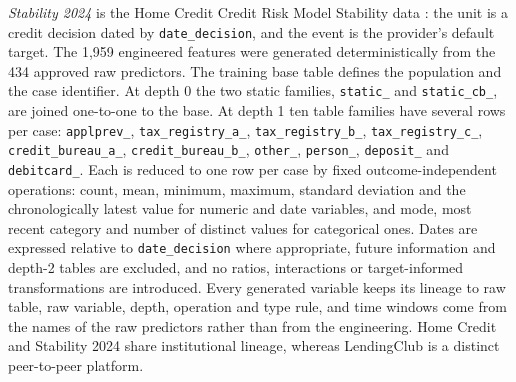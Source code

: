\documentclass[final,5p,twocolumn]{elsarticle}
\begin{document}
\emph{Stability 2024} is the Home Credit Credit Risk Model Stability data \cite{homecredit2024}: the unit is a credit decision dated by \texttt{date\_\allowbreak decision}, and the event is the provider's default target. The 1,959 engineered features were generated deterministically from the 434 approved raw predictors. The training base table defines the population and the case identifier. At depth 0 the two static families, \texttt{static\_} and \texttt{static\_\allowbreak cb\_}, are joined one-to-one to the base. At depth 1 ten table families have several rows per case: \texttt{applprev\_}, \texttt{tax\_\allowbreak registry\_\allowbreak a\_}, \texttt{tax\_\allowbreak registry\_\allowbreak b\_}, \texttt{tax\_\allowbreak registry\_\allowbreak c\_}, \texttt{credit\_\allowbreak bureau\_\allowbreak a\_}, \texttt{credit\_\allowbreak bureau\_\allowbreak b\_}, \texttt{other\_}, \texttt{person\_}, \texttt{deposit\_} and \texttt{debitcard\_}. Each is reduced to one row per case by fixed outcome-independent operations: count, mean, minimum, maximum, standard deviation and the chronologically latest value for numeric and date variables, and mode, most recent category and number of distinct values for categorical ones. Dates are expressed relative to \texttt{date\_\allowbreak decision} where appropriate, future information and depth-2 tables are excluded, and no ratios, interactions or target-informed transformations are introduced. Every generated variable keeps its lineage to raw table, raw variable, depth, operation and type rule, and time windows come from the names of the raw predictors rather than from the engineering. Home Credit and Stability 2024 share institutional lineage, whereas LendingClub is a distinct peer-to-peer platform.
\end{document}
